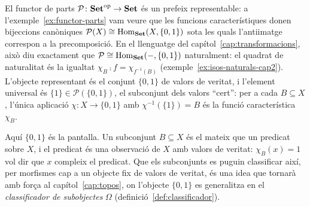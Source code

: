 \begin{exemple}\label{ex:rep-parts}
El functor de parts $\mathcal P\colon\mathbf{Set}^{\mathrm{op}}\to\mathbf{Set}$ és un prefeix representable: a l'exemple~\ref{ex:functor-parts} vam veure que les funcions característiques donen bijeccions canòniques $\mathcal P(X)\cong\operatorname{Hom}_{\mathbf{Set}}(X,\{0,1\})$ sota les quals l'antiimatge correspon a la precomposició. En el llenguatge del capítol~\ref{cap:transformacions}, això diu exactament que $\mathcal P\cong\operatorname{Hom}_{\mathbf{Set}}(-,\{0,1\})$ naturalment: el quadrat de naturalitat és la igualtat $\chi_B\comp f=\chi_{f^{-1}(B)}$ (exemple~\ref{ex:isos-naturals-cap2}). L'objecte representant és el conjunt $\{0,1\}$ de valors de veritat, i l'element universal és $\{1\}\in\mathcal P(\{0,1\})$, el subconjunt dels valors \enquote{cert}: per a cada $B\subseteq X$, l'única aplicació $\chi\colon X\to\{0,1\}$ amb $\chi^{-1}(\{1\})=B$ és la funció característica $\chi_B$.

Aquí $\{0,1\}$ és la pantalla. Un subconjunt $B\subseteq X$ és el mateix que un predicat sobre $X$, i el predicat és una observació de $X$ amb valors de veritat: $\chi_B(x)=1$ vol dir que $x$ compleix el predicat. Que els subconjunts es puguin classificar així, per morfismes cap a un objecte fix de valors de veritat, és una idea que tornarà amb força al capítol~\ref{cap:topos}, on l'objecte $\{0,1\}$ es generalitza en el \emph{classificador de subobjectes} $\Omega$ (definició~\ref{def:classificador}).
\end{exemple}

